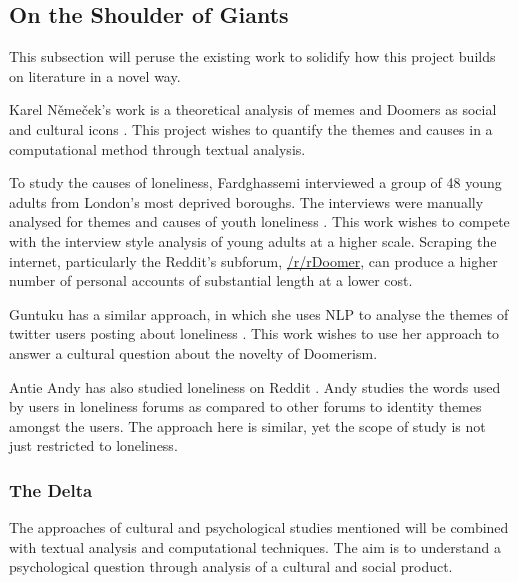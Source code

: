 \documentclass[../report.tex]{subfiles}
\begin{document}
\subsection{On the Shoulder of Giants}
This subsection will peruse the existing work to solidify how this project builds on literature in a novel way. 

Karel Němeček's work is a theoretical analysis of memes and Doomers as social and cultural icons \cite{memes_reservoir}.
This project wishes to quantify the themes and causes in a computational method through textual analysis.

To study the causes of loneliness, Fardghassemi interviewed a group of 48 young adults from London's most deprived boroughs. The interviews were manually analysed for themes and causes of youth loneliness \cite{fardghassemi_interviews}.
This work wishes to compete with the interview style analysis of young adults at a higher scale.
Scraping the internet, particularly the Reddit's subforum,
\href{www.reddit.com/r/Doomer}{/r/rDoomer},
can produce a higher number of personal accounts of substantial length at a lower cost.

Guntuku has a similar approach, in which she uses NLP to analyse the themes of twitter users posting about loneliness \cite{twitter_loneliness}.
This work wishes to use her approach to answer a cultural question about the novelty of Doomerism.

Antie Andy has also studied loneliness on Reddit \cite{andy_2021}.
Andy studies the words used by users in loneliness forums as compared to other forums to identity themes amongst the users.
The approach here is similar, yet the scope of study is not just restricted to loneliness. 

\subsubsection{The Delta}
The approaches of cultural and psychological studies mentioned will be combined with textual analysis and computational techniques. 
The aim is to understand a psychological question through analysis of a cultural and social product.
\end{document}
